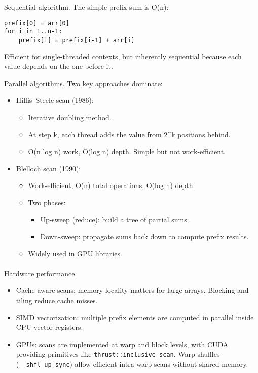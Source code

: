\documentclass[
  letterpaper,
  DIV=11,
  numbers=noendperiod]{scrreprt}
\makeatletter
\let\oldparagraph\paragraph
\renewcommand{\paragraph}{
    \@ifstar
      \xxxParagraphStar
      \xxxParagraphNoStar
  }
\newcommand{\xxxParagraphStar}[1]{\oldparagraph*{#1}\mbox{}}
\newcommand{\xxxParagraphNoStar}[1]{\oldparagraph{#1}\mbox{}}
\providecommand{\tightlist}{%
  \setlength{\itemsep}{0pt}\setlength{\parskip}{0pt}}
\makeatother
\begin{document}
Sequential algorithm. The simple prefix sum is O(n):

\begin{verbatim}
prefix[0] = arr[0]
for i in 1..n-1:
    prefix[i] = prefix[i-1] + arr[i]
\end{verbatim}

Efficient for single-threaded contexts, but inherently sequential
because each value depends on the one before it.

Parallel algorithms. Two key approaches dominate:

\begin{itemize}
\item
  Hillis--Steele scan (1986):

  \begin{itemize}
  \tightlist
  \item
    Iterative doubling method.
  \item
    At step k, each thread adds the value from 2\^{}k positions behind.
  \item
    O(n log n) work, O(log n) depth. Simple but not work-efficient.
  \end{itemize}
\item
  Blelloch scan (1990):

  \begin{itemize}
  \item
    Work-efficient, O(n) total operations, O(log n) depth.
  \item
    Two phases:

    \begin{itemize}
    \tightlist
    \item
      Up-sweep (reduce): build a tree of partial sums.
    \item
      Down-sweep: propagate sums back down to compute prefix results.
    \end{itemize}
  \item
    Widely used in GPU libraries.
  \end{itemize}
\end{itemize}

\paragraph{Hardware performance.}\label{hardware-performance.}

\begin{itemize}
\tightlist
\item
  Cache-aware scans: memory locality matters for large arrays. Blocking
  and tiling reduce cache misses.
\item
  SIMD vectorization: multiple prefix elements are computed in parallel
  inside CPU vector registers.
\item
  GPUs: scans are implemented at warp and block levels, with CUDA
  providing primitives like \texttt{thrust::inclusive\_scan}. Warp
  shuffles (\texttt{\_\_shfl\_up\_sync}) allow efficient intra-warp
  scans without shared memory.
\end{itemize}
\end{document}
